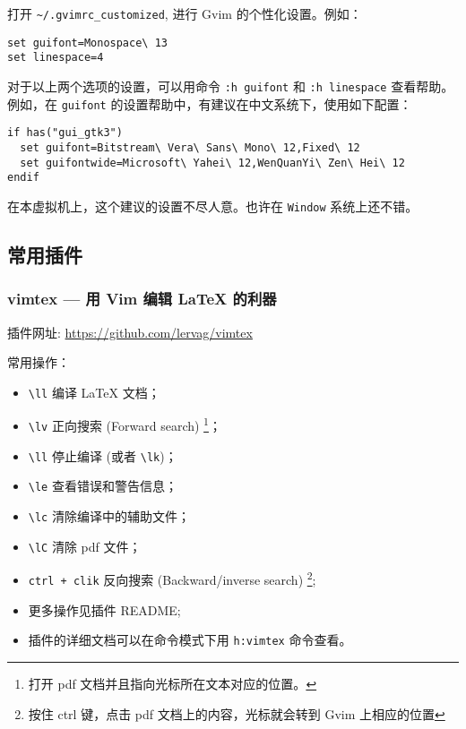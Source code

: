 \documentclass[cn,11pt, simple]{elegantbook}
\begin{document}
打开 \lstinline{~/.gvimrc_customized}, 进行 Gvim 的个性化设置。例如：
\begin{lstlisting}[escapeinside=``]
set guifont=Monospace\ 13
set linespace=4
\end{lstlisting}
对于以上两个选项的设置，可以用命令 \lstinline{:h guifont} 和
\lstinline{:h linespace} 查看帮助。
例如，在 \lstinline{guifont} 的设置帮助中，有建议在中文系统下，使用如下配置：
\begin{lstlisting}[escapeinside=``]
if has("gui_gtk3")
  set guifont=Bitstream\ Vera\ Sans\ Mono\ 12,Fixed\ 12
  set guifontwide=Microsoft\ Yahei\ 12,WenQuanYi\ Zen\ Hei\ 12
endif
\end{lstlisting}
\begin{note}\label{note:guifont}
    在本虚拟机上，这个建议的设置不尽人意。也许在 \lstinline{Window}
    系统上还不错。
\end{note}

\subsection{常用插件}%
\label{sub:vim-plugins}

\subsubsection{vimtex --- 用 Vim 编辑 \LaTeX{} 的利器}%
\label{ssub:vim-plugin-vimtex}

插件网址:
\href{https://github.com/lervag/vimtex}{https://github.com/lervag/vimtex}

常用操作：
\begin{itemize}
    \item \lstinline{\ll} 编译 \LaTeX{} 文档；
    \item \lstinline{\lv} 正向搜索 (Forward search)
        \footnote{打开 pdf 文档并且指向光标所在文本对应的位置。}；
    \item \lstinline{\ll} 停止编译 (或者 \lstinline{\lk})；
    \item \lstinline{\le} 查看错误和警告信息；
    \item \lstinline{\lc} 清除编译中的辅助文件；
    \item \lstinline{\lC} 清除 pdf 文件；
    \item \lstinline{ctrl + clik} 反向搜索 (Backward/inverse search)
        \footnote{按住 ctrl 键，点击 pdf 文档上的内容，光标就会转到 Gvim
        上相应的位置};
    \item 更多操作见插件 README;
    \item 插件的详细文档可以在命令模式下用 \lstinline{h:vimtex} 命令查看。
\end{itemize}
\end{document}
